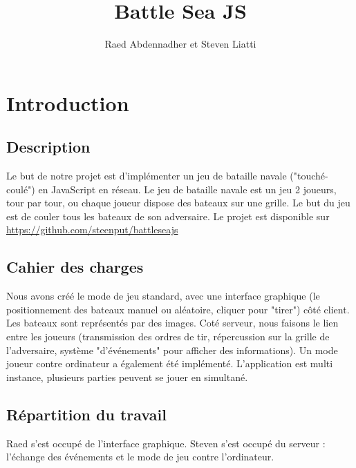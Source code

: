 \documentclass[a4paper, 11pt]{article}
\begin{document}
\title{Battle Sea JS} 
\author{Raed Abdennadher et Steven Liatti} 
\maketitle

\section{Introduction}
\subsection{Description}
Le but de notre projet est d’implémenter un jeu de bataille navale ("touché-coulé") en JavaScript en réseau. Le jeu de bataille navale est un jeu 2 joueurs, tour par tour, ou chaque joueur dispose des bateaux sur une grille. Le but du jeu est de couler tous les bateaux de son adversaire. Le projet est disponible sur \url{https://github.com/steenput/battleseajs}

\subsection{Cahier des charges}
Nous avons créé le mode de jeu standard, avec une interface graphique (le positionnement des bateaux manuel ou aléatoire, cliquer pour "tirer") côté client. Les bateaux sont représentés par des images. Coté serveur, nous faisons le lien entre les joueurs (transmission des ordres de tir, répercussion sur la grille de l’adversaire, système "d'événements" pour afficher des informations). Un mode joueur contre ordinateur a également été implémenté. L'application est multi instance, plusieurs parties peuvent se jouer en simultané.

\subsection{Répartition du travail}
Raed s'est occupé de l'interface graphique. Steven s'est occupé du serveur : l'échange des événements et le mode de jeu contre l'ordinateur.
\end{document}

